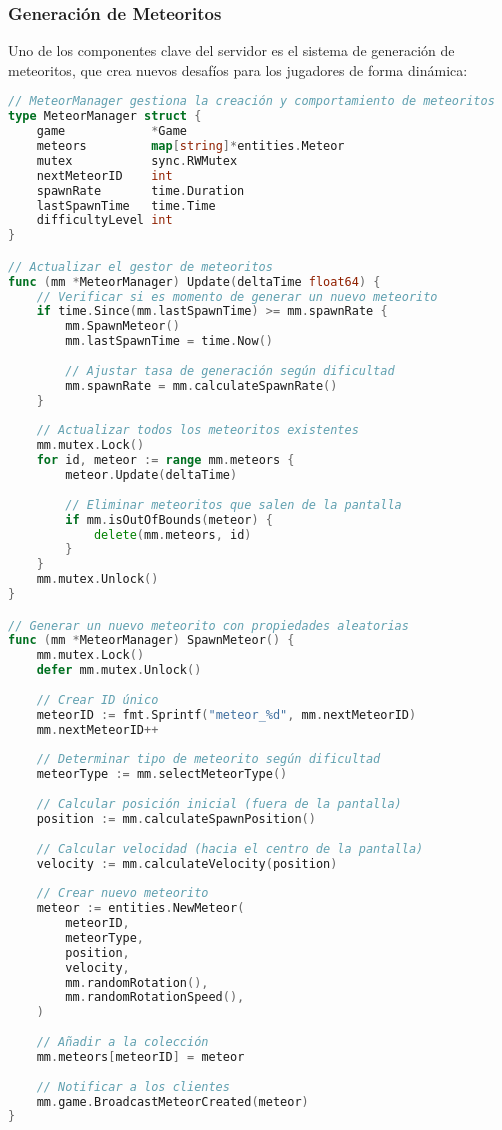 \documentclass[12pt,letterpaper]{article}
\begin{document}
\subsubsection{Generación de Meteoritos}

Uno de los componentes clave del servidor es el sistema de generación de meteoritos, que crea nuevos desafíos para los jugadores de forma dinámica:

\begin{lstlisting}[language=go, caption=Sistema de generación de meteoritos]
// MeteorManager gestiona la creación y comportamiento de meteoritos
type MeteorManager struct {
    game            *Game
    meteors         map[string]*entities.Meteor
    mutex           sync.RWMutex
    nextMeteorID    int
    spawnRate       time.Duration
    lastSpawnTime   time.Time
    difficultyLevel int
}

// Actualizar el gestor de meteoritos
func (mm *MeteorManager) Update(deltaTime float64) {
    // Verificar si es momento de generar un nuevo meteorito
    if time.Since(mm.lastSpawnTime) >= mm.spawnRate {
        mm.SpawnMeteor()
        mm.lastSpawnTime = time.Now()
        
        // Ajustar tasa de generación según dificultad
        mm.spawnRate = mm.calculateSpawnRate()
    }
    
    // Actualizar todos los meteoritos existentes
    mm.mutex.Lock()
    for id, meteor := range mm.meteors {
        meteor.Update(deltaTime)
        
        // Eliminar meteoritos que salen de la pantalla
        if mm.isOutOfBounds(meteor) {
            delete(mm.meteors, id)
        }
    }
    mm.mutex.Unlock()
}

// Generar un nuevo meteorito con propiedades aleatorias
func (mm *MeteorManager) SpawnMeteor() {
    mm.mutex.Lock()
    defer mm.mutex.Unlock()
    
    // Crear ID único
    meteorID := fmt.Sprintf("meteor_%d", mm.nextMeteorID)
    mm.nextMeteorID++
    
    // Determinar tipo de meteorito según dificultad
    meteorType := mm.selectMeteorType()
    
    // Calcular posición inicial (fuera de la pantalla)
    position := mm.calculateSpawnPosition()
    
    // Calcular velocidad (hacia el centro de la pantalla)
    velocity := mm.calculateVelocity(position)
    
    // Crear nuevo meteorito
    meteor := entities.NewMeteor(
        meteorID,
        meteorType,
        position,
        velocity,
        mm.randomRotation(),
        mm.randomRotationSpeed(),
    )
    
    // Añadir a la colección
    mm.meteors[meteorID] = meteor
    
    // Notificar a los clientes
    mm.game.BroadcastMeteorCreated(meteor)
}
\end{lstlisting}
\end{document}
